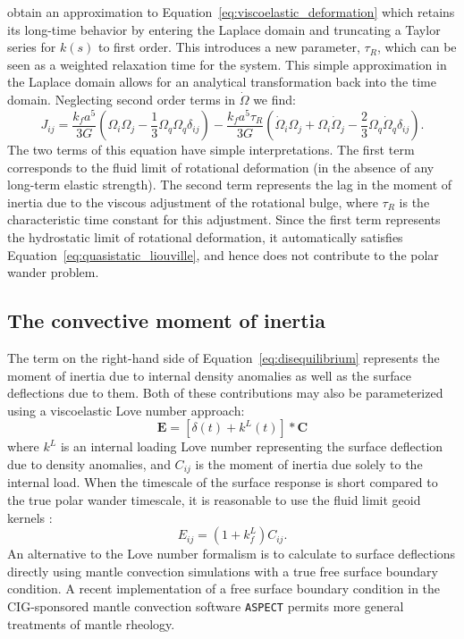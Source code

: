 \documentclass[preprint,12pt,authoryear]{elsarticle}
\begin{document}
\citet{ricard1993polar} obtain an approximation to Equation~\eqref{eq:viscoelastic_deformation} which retains its long-time behavior by entering the Laplace domain and truncating a Taylor series for $k(s)$ to first order.  
This introduces a new parameter, $\tau_R$, which can be seen as a weighted relaxation time for the system.  
This simple approximation in the Laplace domain allows for an analytical transformation back into the time domain. Neglecting second order terms in $\dot{\Omega}$ we find:
\begin{equation}
J_{ij} = \frac{k_f a^5}{3 G} \left( \Omega_i \Omega_j - \frac{1}{3} \Omega_q \Omega_q \delta_{ij} \right) -
 \frac{k_f a^5 \tau_R}{3G} \left(\dot{\Omega}_i \Omega_j + \Omega_i \dot{\Omega}_j - \frac{2}{3} \Omega_q \dot{\Omega}_q \delta_{ij} \right).
\label{eq:rotational_deformation}
\end{equation}
The two terms of this equation have simple interpretations.  
The first term corresponds to the fluid limit of rotational deformation (in the absence of any long-term elastic strength).  
The second term represents the lag in the moment of inertia due to the viscous adjustment of the rotational bulge, where $\tau_R$ is the characteristic time constant for this adjustment.
Since the first term represents the hydrostatic limit of rotational deformation, it automatically satisfies Equation~\eqref{eq:quasistatic_liouville}, and hence does not contribute to the polar wander problem.

\subsection{The convective moment of inertia}
\label{sec:convective_moment}

The term on the right-hand side of Equation~\eqref{eq:disequilibrium} represents the moment of inertia due to internal density anomalies as well as the surface deflections due to them.
Both of these contributions may also be parameterized using a viscoelastic Love number approach:
\begin{equation} 
\mathbf{E} = \left[ \delta(t) + k^L(t) \right] * \mathbf{C}
\end{equation}
where $k^L$ is an internal loading Love number representing the surface deflection due to density anomalies, 
and $C_{ij}$ is the moment of inertia due solely to the internal load.
When the timescale of the surface response is short compared to the true polar wander timescale, it is reasonable to  use the fluid limit geoid kernels \citep[e.g.][]{richards1984geoid}:  
\begin{equation}
E_{ij} = (1+k^L_f) C_{ij}.
\end{equation}
An alternative to the Love number formalism is to calculate to surface deflections directly using mantle convection simulations with a true free surface boundary condition.
A recent implementation of a free surface boundary condition in the CIG-sponsored mantle convection software \texttt{ASPECT} \citep{rose2016free}
permits more general treatments of mantle rheology.
\end{document}
